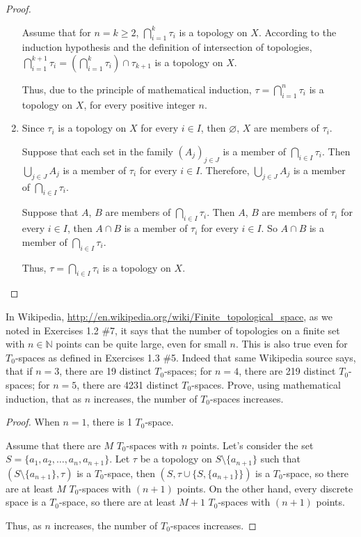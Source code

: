 \begin{proof}
\begin{enumerate}[label={(\roman*)}]
              Assume that for $n = k\geq 2$, $\bigcap^{k}_{i=1}\tau_{i}$ is a topology on $X$. According to the induction hypothesis and the definition of intersection of topologies, $\bigcap^{k+1}_{i=1}\tau_{i} = \left( \bigcap^{k}_{i=1} \tau_{i} \right) \cap \tau_{k+1}$ is a topology on $X$.

              Thus, due to the principle of mathematical induction, $\tau = \bigcap^{n}_{i=1}\tau_{i}$ is a topology on $X$, for every positive integer $n$.
        \item Since $\tau_{i}$ is a topology on $X$ for every $i\in I$, then $\varnothing$, $X$ are members of $\tau_{i}$.

              Suppose that each set in the family ${(A_{j})}_{j\in J}$ is a member of $\bigcap_{i\in I} \tau_{i}$. Then $\bigcup_{j\in J} A_{j}$ is a member of $\tau_{i}$ for every $i\in I$. Therefore, $\bigcup_{j\in J} A_{j}$ is a member of $\bigcap_{i\in I} \tau_{i}$.

              Suppose that $A$, $B$ are members of $\bigcap_{i\in I} \tau_{i}$. Then $A$, $B$ are members of $\tau_{i}$ for every $i\in I$, then $A\cap B$ is a member of $\tau_{i}$ for every $i\in I$. So $A\cap B$ is a member of $\bigcap_{i\in I} \tau_{i}$.

              Thus, $\tau = \bigcap_{i\in I}\tau_{i}$ is a topology on $X$.
    \end{enumerate}
\end{proof}
\newpage

\begin{exercise}
    In Wikipedia, \url{http://en.wikipedia.org/wiki/Finite_topological_space}, as we noted in Exercises 1.2 \#7, it says that the number of topologies on a finite set with
    $n\in \mathbb{N}$ points can be quite large, even for small $n$. This is also true even for $T_{0}$-spaces as defined in Exercises 1.3 \#5. Indeed that same Wikipedia source says, that if $n = 3$, there are 19 distinct $T_{0}$-spaces; for $n = 4$, there are 219 distinct $T_{0}$-spaces; for $n = 5$, there are 4231 distinct $T_{0}$-spaces. Prove, using mathematical induction, that as $n$ increases, the number of $T_{0}$-spaces increases.
\end{exercise}

\begin{proof}
    When $n = 1$, there is 1 $T_{0}$-space.

    Assume that there are $M$ $T_{0}$-spaces with $n$ points. Let's consider the set $S = \{ a_{1}, a_{2}, \ldots, a_{n}, a_{n+1} \}$. Let $\tau$ be a topology on $S\setminus\{ a_{n+1} \}$ such that $(S\setminus\{ a_{n+1} \}, \tau)$ is a $T_{0}$-space, then $(S, \tau\cup\{ S, \{ a_{n+1} \} \})$ is a $T_{0}$-space, so there are at least $M$ $T_{0}$-spaces with $(n+1)$ points. On the other hand, every discrete space is a $T_{0}$-space, so there are at least $M+1$ $T_{0}$-spaces with $(n+1)$ points.

    Thus, as $n$ increases, the number of $T_{0}$-spaces increases.
\end{proof}
\newpage

